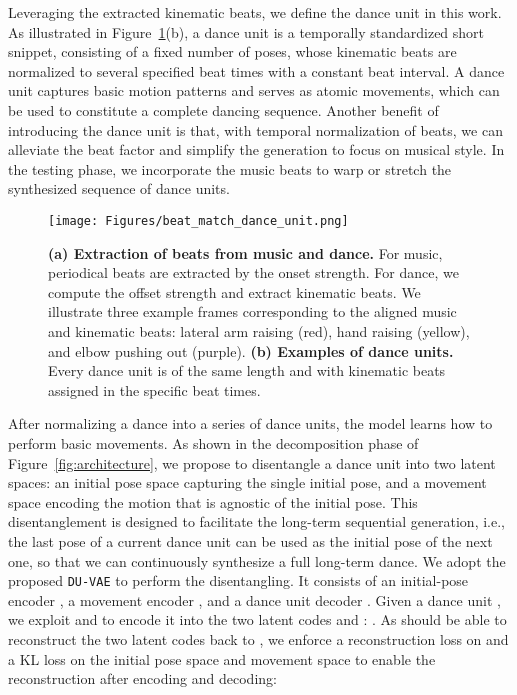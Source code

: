\documentclass{article}
\newlength\figmargin
\begin{document}
Leveraging the extracted kinematic beats, we define the dance unit in this work.
As illustrated in Figure~\ref{fig:beat_match_dance_unit}(b), a dance unit is a temporally standardized short snippet, consisting of a fixed number of poses, whose kinematic beats are normalized to several specified beat times with a constant beat interval.
A dance unit captures basic motion patterns and serves as atomic movements, which can be used to constitute a complete dancing sequence.
Another benefit of introducing the dance unit is that, with temporal normalization of beats, we can alleviate the beat factor and simplify the generation to focus on musical style. 
In the testing phase, we incorporate the music beats to warp or stretch the synthesized sequence of dance units.

\begin{figure}[t]
    \texttt{[image: Figures/beat\_match\_dance\_unit.png]}
\caption{\textbf{(a) Extraction of beats from music and dance.} For music, periodical beats are extracted by the onset strength. For dance, we compute the offset strength and extract kinematic beats. We illustrate three example frames corresponding to the aligned music and kinematic beats: lateral arm raising (red), hand raising (yellow), and elbow pushing out (purple). \textbf{(b) Examples of dance units.} Every dance unit is of the same length and with kinematic beats assigned in the specific beat times.}
    \label{fig:beat_match_dance_unit}
    \vspace{\figmargin}

\end{figure}


After normalizing a dance into a series of dance units, the model learns how to perform basic movements.
As shown in the decomposition phase of Figure~\ref{fig:architecture}, we propose to disentangle a dance unit into two latent spaces: an initial pose space  capturing the single initial pose, and a movement space  encoding the motion that is agnostic of the initial pose.
This disentanglement is designed to facilitate the long-term sequential generation, i.e., the last pose of a current dance unit can be used as the initial pose of the next one, so that we can continuously synthesize a full long-term dance.   
We adopt the proposed \texttt{DU-VAE} to perform the disentangling.
It consists of an initial-pose encoder , a movement encoder , and a dance unit decoder .   
Given a dance unit , we exploit  and  to encode it into the two latent codes  and : .
As  should be able to reconstruct the two latent codes back to , 
we enforce a reconstruction loss on  and a KL loss on the initial pose space and movement space to enable the reconstruction after encoding and decoding:
\end{document}
